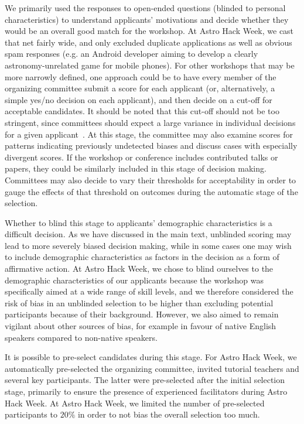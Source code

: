 \documentclass[12pt]{article}
\begin{document}
We primarily used the responses to open-ended questions (blinded to personal characteristics) to understand applicants' motivations and decide whether they would be an overall good match for the workshop. At Astro Hack Week, we cast that net fairly wide, and only excluded duplicate applications as well as obvious spam responses (e.g. an Android developer aiming to develop a clearly astronomy-unrelated game for mobile phones). For other workshops that may be more narrowly defined, one approach could be to have every member of the organizing committee submit a score for each applicant (or, alternatively, a simple yes/no decision on each applicant), and then decide on a cut-off for acceptable candidates. It should be noted that this cut-off should not be too stringent, since committees should expect a large variance in individual decisions for a given applicant~\cite{grove1996}. At this stage, the committee may also examine scores for patterns indicating previously undetected biases and discuss cases with especially divergent scores. If the workshop or conference includes contributed talks or papers, they could be similarly included in this stage of decision making. Committees may also decide to vary their thresholds for acceptability in order to gauge the effects of that threshold on outcomes during the automatic stage of the selection.

Whether to blind this stage to applicants' demographic characteristics is a difficult decision. As we have discussed in the main text, unblinded scoring may lead to more severely biased decision making, while in some cases one may wish to include demographic characteristics as factors in the decision as a form of affirmative action. At Astro Hack Week, we chose to blind ourselves to the demographic characteristics of our applicants because the workshop was specifically aimed at a wide range of skill levels, and we therefore considered the risk of bias in an unblinded selection to be higher than excluding potential participants because of their background. However, we also aimed to remain vigilant about other sources of bias, for example in favour of native English speakers compared to non-native speakers.

It is possible to pre-select candidates during this stage. For Astro Hack Week, we automatically pre-selected the organizing committee, invited tutorial teachers and several key participants. The latter were pre-selected after the initial selection stage, primarily to ensure the presence of experienced facilitators during Astro Hack Week. At Astro Hack Week, we limited the number of pre-selected participants to $20\%$ in order to not bias the overall selection too much. 
\end{document}
